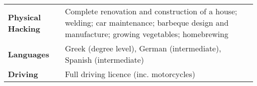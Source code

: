 \documentclass[a4paper,10pt]{article}
\begin{document}

\begin{tabular}{p{1.8in}p{4.3in}}
\textbf{Physical Hacking} & Complete renovation and construction of a house; welding; car maintenance; barbeque design and manufacture; growing vegetables; homebrewing\\
\textbf{Languages} & Greek (degree level), German (intermediate), Spanish (intermediate)\\
\textbf{Driving} & Full driving licence (inc. motorcycles) \\

\end{tabular}
\end{document}
